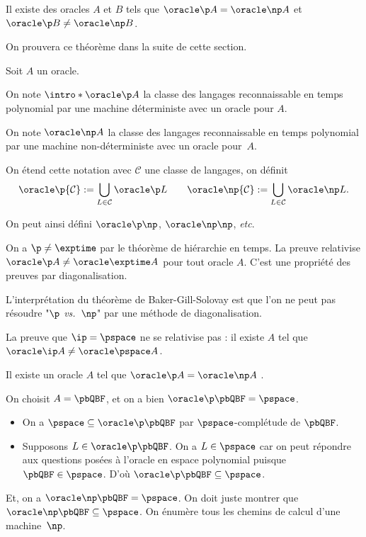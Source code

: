 \documentclass[./main]{subfiles}
\begin{document}
  \begin{thm}
    Il existe des oracles $A$ et $B$ tels que
    $\oracle \p A = \oracle \np A$ et  $\oracle \p B \neq \oracle \np B$.
  \end{thm}

  On prouvera ce théorème dans la suite de cette section.

  \begin{defn}
    Soit $A$ un oracle.

    On note $\intro* \oracle \p A$ la classe des langages reconnaissable en temps polynomial par une machine déterministe avec un oracle pour $A$.

    On note $\oracle \np A$ la classe des langages reconnaissable en temps polynomial par une machine non-déterministe avec un oracle pour~$A$.

    On étend cette notation avec $\mathcal{C}$ une classe de langages, on définit
    \[
    \oracle \p {\mathcal{C}} := \bigcup_{L \in \mathcal{C}} \oracle \p L
    \quad\quad
    \oracle \np {\mathcal{C}} := \bigcup_{L \in \mathcal{C}} \oracle \np L
    .\]
  \end{defn}

  On peut ainsi défini $\oracle \p \np$,  $\oracle \np \np$, \textit{etc}.

  \begin{rmk}
    On a $\p \neq \exptime$ par le théorème de hiérarchie en temps.
    La preuve relativise $\oracle \p A \neq \oracle \exptime A$ pour tout oracle $A$.
    C'est une propriété des preuves par diagonalisation.
  \end{rmk}

  \begin{rmk}
    L'interprétation du théorème de Baker-Gill-Solovay est que l'on ne peut pas résoudre "$\p$ \textit{vs.}\ $\np$" par une méthode de diagonalisation.

    La preuve que $\ip = \pspace$ ne se relativise pas : il existe $A$ tel que $\oracle \ip A \neq \oracle \pspace A$.
  \end{rmk}

  \begin{prop}
    Il existe un oracle $A$ tel que $\oracle \p A = \oracle \np A$ .
  \end{prop}
  \begin{prv}
    On choisit $A = \pbQBF$, et on a bien $\oracle \p \pbQBF = \pspace$.
    \begin{itemize}
      \item On a $\pspace \subseteq \oracle \p \pbQBF$ par $\pspace$-complétude de $\pbQBF$.
      \item Supposons  $L \in \oracle \p \pbQBF$.
        On a $L \in \pspace$ car on peut répondre aux questions posées à l'oracle en espace polynomial puisque $\pbQBF \in \pspace$. D'où $\oracle \p \pbQBF \subseteq \pspace$.
    \end{itemize}

    Et, on a $\oracle \np \pbQBF = \pspace$. On doit juste montrer que  $\oracle \np\pbQBF \subseteq \pspace$.
    On énumère tous les chemins de calcul d'une machine~$\np$.
  \end{prv}
\end{document}

